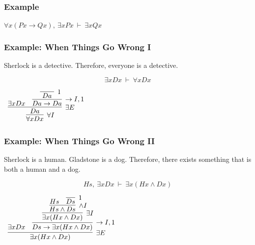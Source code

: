 \documentclass{beamer}
\theoremstyle{indentDefn} \newtheorem{defn}[]{Definition}
\begin{document}
\begin{frame}
	\frametitle{Example}
	
	$\forall x (Px \rightarrow Qx), \ \exists x Px \ \vdash \ \exists x Qx$
	
	
	\vspace{65mm}
	
\end{frame}

\begin{frame}
	\frametitle{Example: When Things Go Wrong I}
	
	Sherlock is a detective. Therefore, everyone is a detective. 
	
	\vspace{5mm}
	
	$$ \exists x Dx \ \vdash \ \forall x Dx $$
	
	\vspace{5mm}
	
	\begin{center}
		$\begin{array}{c}
			\infer[\forall I]{\forall x Dx}{\infer[\exists E]{Da}
					{\exists x Dx & \infer[\rightarrow I, 1]{Da \rightarrow Da}{\infer[1]{ \ Da \ }{}}
				}
			}		
		 \end{array}$
	\end{center}

	\vspace{20mm}	
\end{frame}
	
\begin{frame}
	\frametitle{Example: When Things Go Wrong II}
	
	Sherlock is a human. Gladstone is a dog. Therefore, there exists something that is both a human and a dog. 
	
	\vspace{5mm}
	
	$$ Hs, \ \exists x Dx \ \vdash \ \exists x (Hx \land Dx) $$
	
	\vspace{5mm}
	
	\begin{center}
		$\begin{array}{c}	
			\infer[\exists E]{\exists x (Hx \land Dx)}{\exists x Dx & \infer[\rightarrow I, 1]{Ds \rightarrow \exists x (Hx \land Dx)}
				{\infer[\exists I]{\exists x (Hx \land Dx)}
					{\infer[\land I]{Hs \land Ds}
						{Hs & \infer[1]{Ds}
							{}}}}}
	     \end{array}$
	\end{center}
\end{frame}
\end{document}

